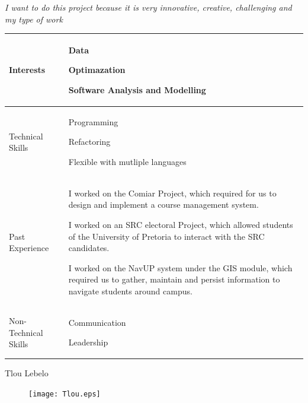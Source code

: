 \documentclass{article}
\begin{document}
 	\textit{I want to do this project because it is very innovative, creative, challenging and my type of work}

\begin{center}
\begin{tabularx}{1.0\textwidth}{|p{3cm}|X|}
\hline
 {\LARGE Interests} & 
 \begin{compactitem}
     \item {\large Data}
     \item {\large Optimazation}
     \item {\large Software Analysis and Modelling}
 \end{compactitem} \\ 
 \hline
 {\LARGE Technical Skills} & 
 \begin{compactitem}
     \item {\large Programming} 
     \item {\large Refactoring}
     \item {\large Flexible with mutliple languages}
 \end{compactitem} \\ 
 \hline
 {\LARGE Past Experience} & 
 \begin{compactitem}
     \item {\large I worked on the Comiar Project, which required for us to design and implement a course management system.}
     \item {\large I worked on an SRC electoral Project, which allowed students of the University of Pretoria to interact with the SRC candidates.}
	 \item {\large I worked on the NavUP system under the GIS module, which  required us to gather, maintain and persist information to navigate students around campus.}
 \end{compactitem} \\ 
 \hline
 {\LARGE Non-Technical Skills} & 
 \begin{compactitem}
     \item {\large Communication}
     \item {\large Leadership}
 \end{compactitem} \\
 \hline 
\end{tabularx}
\end{center}
\pagebreak
{\huge Tlou Lebelo}
\begin{figure}[h]
\centering
\texttt{[image: Tlou.eps]} 
\end{figure}
\end{document}
